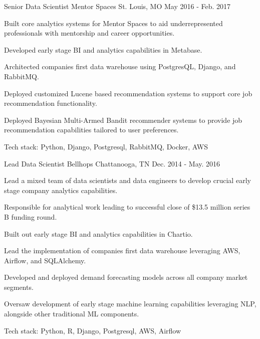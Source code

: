 \begin{cventries}
  \cventry
    {Senior Data Scientist} %
    {Mentor Spaces} %
    {St. Louis, MO} %
    {May 2016 - Feb. 2017} %
    {
      \begin{cvitems} %
        \item {Built core analytics systems for Mentor Spaces to aid underrepresented professionals with mentorship and career opportunities.}
        \item {Developed early stage BI and analytics capabilities in Metabase.}
        \item {Architected companies first data warehouse using PostgresQL, Django, and RabbitMQ.}
        \item {Deployed customized Lucene based recommendation systems to support core job recommendation functionality.}
        \item {Deployed Bayesian Multi-Armed Bandit recommender systems to provide job recommendation capabilities tailored to user preferences.}
        \item {Tech stack: Python, Django, Postgresql, RabbitMQ, Docker, AWS}
      \end{cvitems}
    }

  \cventry
    {Lead Data Scientist} %
    {Bellhops} %
    {Chattanooga, TN} %
    {Dec. 2014 - May. 2016} %
    {
      \begin{cvitems} %
        \item {Lead a mixed team of data scientists and data engineers to develop crucial early stage company analytics capabilities.}
        \item {Responsible for analytical work leading to successful close of \$13.5 million series B funding round.}
        \item {Built out early stage BI and analytics capabilities in Chartio.}
        \item {Lead the implementation of companies first data warehouse leveraging AWS, Airflow, and SQLAlchemy.}
        \item {Developed and deployed demand forecasting models across all company market segments.}
        \item {Oversaw development of early stage machine learning capabilities leveraging NLP, alongside other traditional ML components.}
        \item {Tech stack: Python, R, Django, Postgresql, AWS, Airflow}
      \end{cvitems}
    }


\end{cventries}
